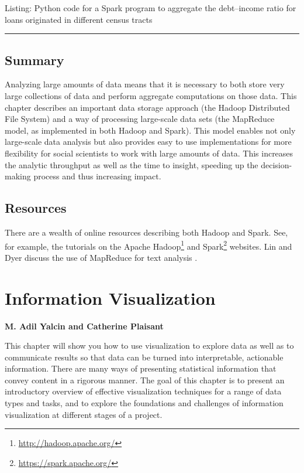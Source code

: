 \documentclass[]{krantz}
\begin{document}
Listing: Python code for a Spark program to aggregate the debt--income
ratio for loans originated in different census tracts

\begin{center}\rule{0.5\linewidth}{\linethickness}\end{center}

\section{Summary}\label{summary-3}

Analyzing large amounts of data means that it is necessary to both store
very large collections of data and perform aggregate computations on
those data. This chapter describes an important data storage approach
(the Hadoop Distributed File System) and a way of processing large-scale
data sets (the MapReduce model, as implemented in both Hadoop and
Spark). This model enables not only large-scale data analysis but also
provides easy to use implementations for more flexibility for social
scientists to work with large amounts of data. This increases the
analytic throughput as well as the time to insight, speeding up the
decision-making process and thus increasing impact.

\section{Resources}\label{resources-2}

There are a wealth of online resources describing both Hadoop and Spark.
See, for example, the tutorials on the Apache Hadoop\footnote{\url{http://hadoop.apache.org/}}
and Spark\footnote{\url{https://spark.apache.org/}} websites. Lin and
Dyer discuss the use of MapReduce for text analysis \citep{lin2010data}.

\hypertarget{chap:viz}{\chapter{Information
Visualization}\label{chap:viz}}

\textbf{M. Adil Yalcin and Catherine Plaisant}

This chapter will show you how to use visualization to explore data as
well as to communicate results so that data can be turned into
interpretable, actionable information. There are many ways of presenting
statistical information that convey content in a rigorous manner. The
goal of this chapter is to present an introductory overview of effective
visualization techniques for a range of data types and tasks, and to
explore the foundations and challenges of information visualization at
different stages of a project.
\end{document}

